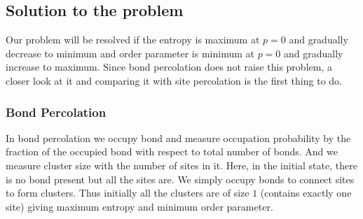 	\subsection{Solution to the problem}
		Our problem will be resolved if the entropy is maximum at $p=0$ and gradually decrease to minimum and order parameter is minimum at $p=0$ and gradually increase to maximum. Since bond percolation does not raise this problem, a closer look at it and comparing it with site percolation is the first thing to do.
		\subsubsection{Bond Percolation}
		 In bond percolation we occupy bond and measure occupation probability by the fraction of the occupied bond with respect to total number of bonds. And we measure cluster size with the number of sites in it. Here, in the initial state, there is no bond present but all the sites are. We simply occupy bonds to connect sites to form clusters. Thus initially all the clusters are of size $1$ (contains exactly one site) giving maximum entropy and minimum order parameter. 
		
